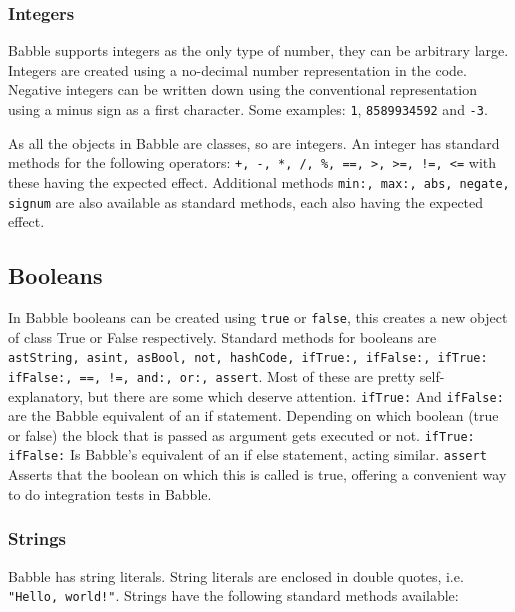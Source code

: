 \documentclass[a4paper]{article}
\begin{document}


\subsubsection{Integers}

Babble supports integers as the only type of number, they can be arbitrary large. Integers are created using a no-decimal number representation in the code. Negative integers can be written down using the conventional representation using a minus sign as a first character. Some examples:
\texttt{1}, \texttt{8589934592} and \texttt{-3}.

As all the objects in Babble are classes, so are integers. An integer has standard methods for the following operators: \texttt{+, -, *, /, \%, ==, >, >=, !=, <=} with these having the expected effect. Additional methods \texttt{min:, max:, abs, negate, signum} are also available as standard methods, each also having the expected effect.

\subsection{Booleans}
In Babble booleans can be created using \texttt{true} or  \texttt{false}, this creates a new object of class True or False respectively. Standard methods for booleans are
\texttt{astString, asint, asBool, not, hashCode, ifTrue:, ifFalse:, ifTrue: ifFalse:, ==, !=, and:, or:, assert}. Most of these are pretty self-explanatory, but there are some which deserve attention. \texttt{ifTrue:} And \texttt{ifFalse:} are the Babble equivalent of an if statement. Depending on which boolean (true or false) the block that is passed as argument gets executed or not. \texttt{ifTrue: ifFalse:} Is Babble's equivalent of an if else statement, acting similar. \texttt{assert} Asserts that the boolean on which this is called is true, offering a convenient way to do integration tests in Babble.


\subsubsection{Strings}

Babble has string literals. String literals are enclosed in double quotes, i.e. \texttt{"Hello, world!"}. Strings have the following standard methods available:
\end{document}
